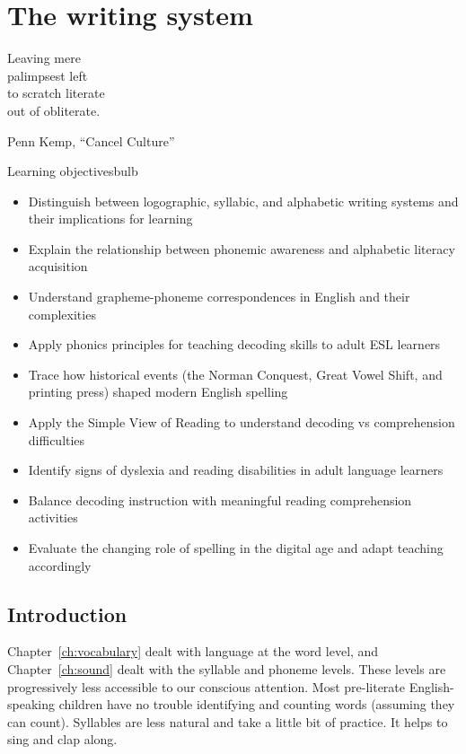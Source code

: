 \chapter{The writing system}

\epigraph{Leaving mere\\
palimpsest left\\
to scratch literate\\
out of obliterate.}{Penn Kemp, \enquote{Cancel Culture}}

\begin{tblsframedsymbol}{Learning objectives}{bulb}
\begin{itemize}[noitemsep, leftmargin=*]
    \item Distinguish between logographic, syllabic, and alphabetic writing systems and their implications for learning
    \item Explain the relationship between phonemic awareness and alphabetic literacy acquisition
    \item Understand grapheme-phoneme correspondences in English and their complexities
    \item Apply phonics principles for teaching decoding skills to adult ESL learners
    \item Trace how historical events (the Norman Conquest, Great Vowel Shift, and printing press) shaped modern English spelling
    \item Apply the Simple View of Reading to understand decoding vs comprehension difficulties
    \item Identify signs of dyslexia and reading disabilities in adult language learners
    \item Balance decoding instruction with meaningful reading comprehension activities
    \item Evaluate the changing role of spelling in the digital age and adapt teaching accordingly
\end{itemize}
\end{tblsframedsymbol}

\section{Introduction}
Chapter~\ref{ch:vocabulary} dealt with language at the word level, and Chapter~\ref{ch:sound} dealt with the syllable and phoneme levels. These levels are progressively less accessible to our conscious attention. Most pre-literate English-speaking children have no trouble identifying and counting words (assuming they can count). Syllables are less natural and take a little bit of practice. It helps to sing and clap along. 


